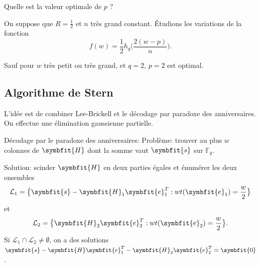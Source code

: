 \documentclass{scrartcl}[a4paper,9pt,headings=small,footinclude=false]
\theoremstyle{definition}
\theoremstyle{remark}
\begin{document}
Quelle est la valeur optimale de $p$ ?

On suppose que $R=\frac{1}{2}$ et $n$ très grand constant.
Étudions les variations de la fonction
\[
f(w)= \frac{1}{2} h_q\bigg(\frac{2(w - p)}{n}\bigg).
\]


Sauf pour $w$ très petit ou très grand, et $q=2$, $p=2$ est optimal.



\subsection{Algorithme de Stern}

L'idée est de combiner Lee-Brickell et le décodage par paradoxe des anniversaires. On effectue une élimination gaussienne partielle.

Décodage par le paradoxe des anniversaires:
Problème: trouver au plus $w$ colonnes de $\symbfit{H}$ dont la somme vaut $\symbfit{s}$ sur $\mathbb{F}_q$.

Solution: scinder $\symbfit{H}$ en deux parties égales et énumérer les deux ensembles
\[\mathcal{L}_1=\big\{ \symbfit{s}-\symbfit{H}_1\symbfit{e}_1^T : wt(\symbfit{e}_1) =\frac{w}{2} \big\}\]
et \[\mathcal{L}_2=\big\{ \symbfit{H}_2 \symbfit{e}_2^T : wt(\symbfit{e}_2) = \frac{w}{2}\big\}.\]
Si $\mathcal{L}_1\cap \mathcal{L}_2\neq \emptyset$, on a des solutions $\symbfit{s}-\symbfit{H}\symbfit{e}_1^T-\symbfit{H}_2\symbfit{e}_2^T=\symbfit{0}$.
\end{document}
